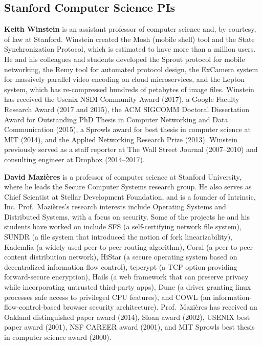 \documentclass[10pt]{article}
\newcommand{\slim}{\vspace{0.5\baselineskip}}
\begin{document}
\subsection{Stanford Computer Science PIs}

\noindent \textbf{Keith Winstein} is an assistant professor of
computer science and, by courtesy, of law at Stanford. Winstein
created the Mosh (mobile shell) tool and the State Synchronization
Protocol, which is estimated to have more than a million users. He and
his colleagues and students developed the Sprout protocol for mobile
networking, the Remy tool for automated protocol design, the ExCamera
system for massively parallel video encoding on cloud microservices,
and the Lepton system, which has re-compressed hundreds of petabytes
of image files. Winstein has received the Usenix NSDI Community Award
(2017), a Google Faculty Research Award (2017 and 2015), the ACM
SIGCOMM Doctoral Dissertation Award for Outstanding PhD Thesis in
Computer Networking and Data Communication (2015), a Sprowls award for
best thesis in computer science at MIT (2014), and the Applied
Networking Research Prize (2013). Winstein previously served as a
staff reporter at The Wall Street Journal (2007--2010) and consulting
engineer at Dropbox (2014--2017).

\slim

\noindent \textbf{David Mazi\`{e}res} is a professor of computer
science at Stanford University, where he leads the Secure Computer
Systems research group. He also serves as Chief Scientist at Stellar
Development Foundation, and is a founder of Intrinsic,
Inc. Prof.~Mazi\`{e}res's research interests include Operating Systems
and Distributed Systems, with a focus on security. Some of
the projects he and his students have worked on include SFS (a
self-certifying network file system), SUNDR (a file system that
introduced the notion of fork linearizability), Kademlia (a widely
used peer-to-peer routing algorithm), Coral (a peer-to-peer content
distribution network), HiStar (a secure operating system based on
decentralized information flow control), tcpcrypt (a TCP option
providing forward-secure encryption), Hails (a web framework that can
preserve privacy while incorporating untrusted third-party apps), Dune
(a driver granting linux processes safe access to privileged CPU
features), and COWL (an information-flow-control-based browser
security architecture). Prof.~Mazi\`{e}res has received an Oakland distinguished paper award (2014), Sloan award
(2002), USENIX best paper award (2001), NSF CAREER award (2001), and MIT
Sprowls best thesis in computer science award (2000).
\end{document}

